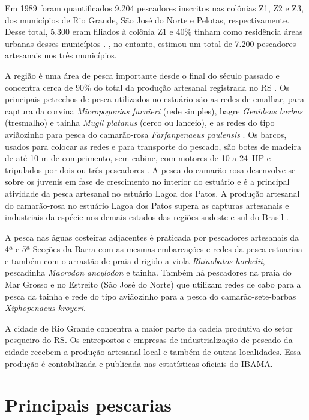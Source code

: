 \documentclass[a4paper,11pt,twoside,showtrims,onecolumn,openright,final]{memoir}
\begin{document}

Em 1989 foram quantificados 9.204 pescadores inscritos nas colônias Z1, Z2 e Z3, 
dos municípios de Rio Grande, São José do Norte e Pelotas, respectivamente.
Desse total, 5.300 eram filiados à colônia Z1 e 40\% tinham como residência 
áreas urbanas desses municípios \citep{habiaga1998}. \citet{garcez2001}, no entanto, estimou 
um total de 7.200 pescadores artesanais nos três municípios.

A região é uma área de pesca importante desde o final do século passado 
e concentra cerca de 90\% do total da produção artesanal registrada no RS \citep{silva1990,REIS1994}.
Os principais petrechos de pesca utilizados no estuário são as redes de emalhar, 
para captura da corvina \emph{Micropogonias furnieri} (rede simples), 
bagre \emph{Genidens barbus} (tresmalho) e tainha \emph{Mugil platanus} (cerco ou lanceio), e as 
redes do tipo aviãozinho para pesca do camarão-rosa \emph{Farfanpenaeus paulensis} \citep{dincao1991,REIS1994}. 
Os barcos, usados para colocar as redes e para transporte do pescado, são botes
de madeira de até 10 m de comprimento, sem cabine, com motores de 10 a 24~HP 
e tripulados por dois ou três pescadores \citep{REIS1994}. A pesca do camarão-rosa 
desenvolve-se sobre os juvenis em fase de crescimento no interior do estuário 
e é a principal atividade da pesca artesanal no estuário Lagoa dos Patos.
A produção artesanal do camarão-rosa no estuário Lagoa dos Patos supera as capturas 
artesanais e industriais da espécie nos demais estados das regiões sudeste e sul 
do Brasil \citep{dincao1991}.

A pesca nas águas costeiras adjacentes é praticada por pescadores artesanais 
da 4ª e 5ª Secções da Barra com as mesmas embarcações e redes da pesca estuarina 
e também com o arrastão de praia dirigido a viola \emph{Rhinobatos horkelii}, 
pescadinha \emph{Macrodon ancylodon} e tainha. Também há pescadores na praia do Mar Grosso
e no Estreito (São José do Norte) que utilizam redes de cabo para a pesca da 
tainha e rede do tipo aviãozinho para a pesca do camarão-sete-barbas \emph{Xiphopenaeus kroyeri}.

A cidade de Rio Grande concentra a maior parte da cadeia produtiva do setor pesqueiro 
do RS. Os entrepostos e empresas de industrialização de pescado da cidade
recebem a produção artesanal local e também de outras localidades. Essa produção
é contabilizada e publicada nas estatísticas oficiais do IBAMA.

\section*{Principais pescarias}
\end{document}
